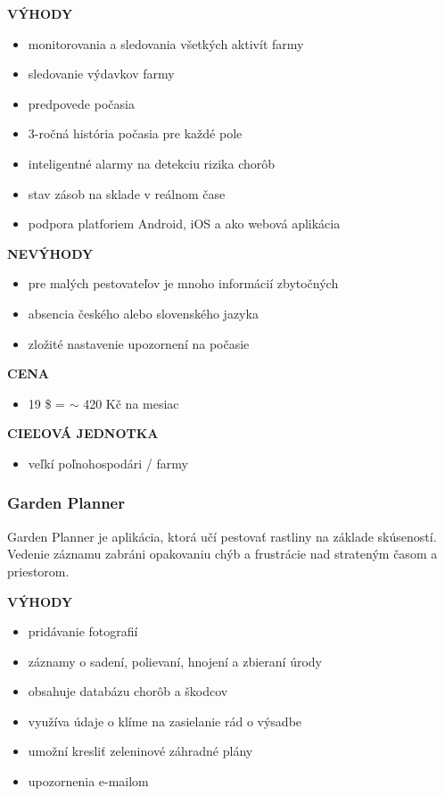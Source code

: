 \documentclass[twoside]{ctuthesis}
\theoremstyle{plain}
\theoremstyle{definition}
\theoremstyle{note}
\begin{document}
\textbf{VÝHODY}
\begin{itemize}
\item monitorovania a sledovania všetkých aktivít farmy
\item sledovanie výdavkov farmy
\item predpovede počasia
\item 3-ročná história počasia pre každé pole
\item inteligentné alarmy na detekciu rizika chorôb
\item stav zásob na sklade v reálnom čase 
\item podpora platforiem Android, iOS a ako webová aplikácia
\end{itemize}

\textbf{NEVÝHODY}
\begin{itemize}
\item pre malých pestovateľov je mnoho informácií zbytočných
\item absencia českého alebo slovenského jazyka
\item zložité nastavenie upozornení na počasie
\end{itemize}

\textbf{CENA}
\begin{itemize}
\item 19 \$ = $\sim$ 420 Kč na mesiac 
\end{itemize}

\textbf{CIEĽOVÁ JEDNOTKA}
\begin{itemize}
\item veľkí poľnohospodári / farmy
\end{itemize}


\subsubsection*{Garden Planner}
Garden Planner je aplikácia, ktorá učí pestovať rastliny na základe skúseností. Vedenie záznamu zabráni opakovaniu chýb a frustrácie nad strateným časom a priestorom. \cite{planner}
\newline

\textbf{VÝHODY}
\begin{itemize}
\item pridávanie fotografií
\item záznamy o sadení, polievaní, hnojení a zbieraní úrody
\item obsahuje databázu chorôb a škodcov
\item využíva údaje o klíme na zasielanie rád o výsadbe
\item umožní kresliť zeleninové záhradné plány
\item upozornenia e-mailom
\end{itemize}
\end{document}
